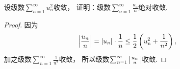 \begin{example}
设级数\(\sum_{n=1}^\infty u_n^2\)收敛，
证明：级数\(\sum_{n=1}^\infty \frac{u_n}{n}\)绝对收敛.
\begin{proof}
因为\[
	\abs{\frac{u_n}{n}}
	= \abs{u_n} \cdot \frac{1}{n}
	\leq \frac12 \left( u_n^2 + \frac{1}{n^2} \right),
\]
加之级数\(\sum_{n=1}^\infty \frac{1}{n^2}\)收敛，
所以级数\(\sum_{n=1}^\infty \abs{\frac{u_n}{n}}\)收敛.
\end{proof}
\end{example}
